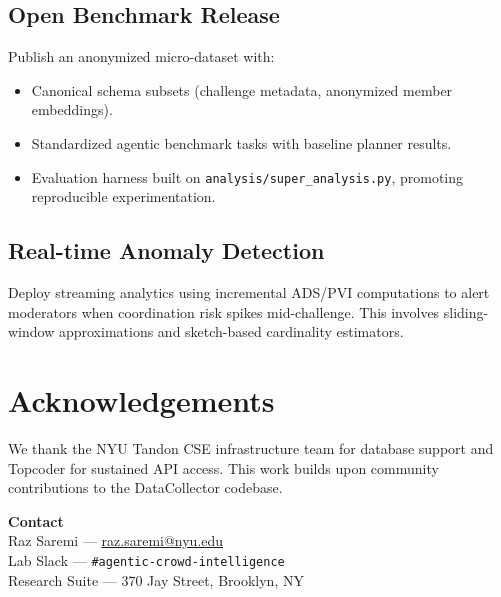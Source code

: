 \documentclass[11pt]{article}
\begin{document}
\subsection{Open Benchmark Release}
Publish an anonymized micro-dataset with:
\begin{itemize}[leftmargin=*]
  \item Canonical schema subsets (challenge metadata, anonymized member embeddings).
  \item Standardized agentic benchmark tasks with baseline planner results.
  \item Evaluation harness built on \texttt{analysis/super\_analysis.py}, promoting reproducible experimentation.
\end{itemize}

\subsection{Real-time Anomaly Detection}
Deploy streaming analytics using incremental ADS/PVI computations to alert moderators when coordination risk spikes mid-challenge. This involves sliding-window approximations and sketch-based cardinality estimators.

\section*{Acknowledgements}
We thank the NYU Tandon CSE infrastructure team for database support and Topcoder for sustained API access. This work builds upon community contributions to the DataCollector codebase.

\bigskip
\noindent\textbf{Contact} \\
Raz Saremi --- \href{mailto:raz.saremi@nyu.edu}{raz.saremi@nyu.edu} \\
Lab Slack --- \texttt{\#agentic-crowd-intelligence} \\
Research Suite --- 370 Jay Street, Brooklyn, NY
\end{document}
